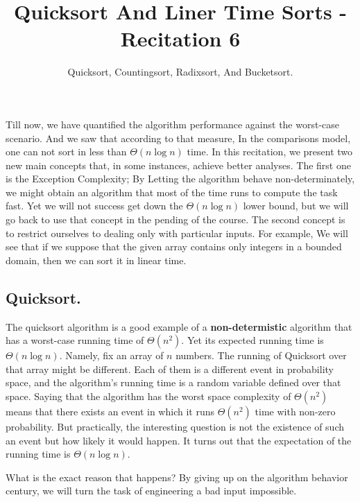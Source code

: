 
\title{Quicksort And Liner Time Sorts  - Recitation 6} 
\author{Quicksort, Countingsort, Radixsort, And Bucketsort.}


Till now, we have quantified the algorithm performance against the worst-case scenario. And we saw that according to that measure, In the comparisons model, one can not sort in less than $\Theta\left( n\log n \right) $ time. In this recitation, we present two new main concepts that, in some instances, achieve better analyses. The first one is the Exception Complexity; By Letting the algorithm behave non-determinately, we might obtain an algorithm that most of the time runs to compute the task fast. Yet we will not success get down the $\Theta\left(n\log n\right)$ lower bound, but we will go back to use that concept in the pending of the course. The second concept is to restrict ourselves to dealing only with particular inputs. For example, We will see that if we suppose that the given array contains only integers in a bounded domain, then we can sort it in linear time.  


\subsection{Quicksort.}
The quicksort algorithm is a good example of a \textbf{non-determistic} algorithm that has a worst-case running time of $\Theta\left(n^{2}\right)$. Yet its expected running time is $\Theta\left(n\log n\right)$. Namely, fix an array of $n$ numbers. The running of Quicksort over that array might be different. Each of them is a different event in probability space, and the algorithm's running time is a random variable defined over that space. Saying that the algorithm has the worst space complexity of $\Theta(n^{2})$ means that there exists an event in which it runs $\Theta\left(n^{2}\right)$ time with non-zero probability. But practically, the interesting question is not the existence of such an event but how likely it would happen. It turns out that the expectation of the running time is $\Theta\left(n\log n\right)$.  

What is the exact reason that happens? By giving up on the algorithm behavior century, we will turn the task of engineering a bad input impossible.    
 

